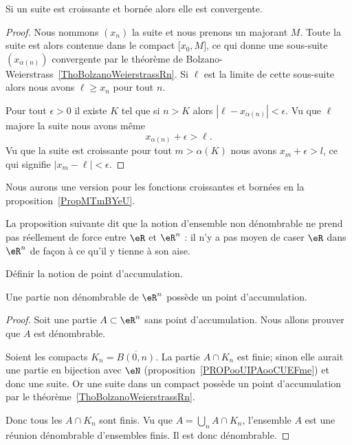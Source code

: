 \begin{corollary}   \label{CorFHbMqGGyi}
    Si un suite est croissante et bornée alors elle est convergente.
\end{corollary}

\begin{proof}
    Nous nommons \( (x_n)\) la suite et nous prenons un majorant \( M\). Toute la suite est alors contenue dans le compact \( \mathopen[ x_0 , M \mathclose]\), ce qui donne une sous-suite \( (x_{\alpha(n)})\) convergente par le théorème de Bolzano-Weierstrass~\ref{ThoBolzanoWeierstrassRn}. Si \( \ell\) est la limite de cette sous-suite alors nous avons \( \ell\geq x_n\) pour tout \( n\).

    Pour tout \( \epsilon>0\) il existe \( K\) tel que si \( n>K\) alors \( | \ell-x_{\alpha(n)} |<\epsilon\). Vu que \( \ell\) majore la suite nous avons même
    \begin{equation}
        x_{\alpha(n)}+\epsilon>\ell.
    \end{equation}
    Vu que la suite est croissante pour tout \( m>\alpha(K)\) nous avons \( x_m+\epsilon>l\), ce qui signifie \( | x_m-\ell |<\epsilon\).
\end{proof}
Nous aurons une version pour les fonctions croissantes et bornées en la proposition~\ref{PropMTmBYeU}.

La proposition suivante dit que la notion d'ensemble non dénombrable ne prend pas réellement de force entre \( \eR\) et \( \eR^n\) : il n'y a pas moyen de caser \( \eR\) dans \( \eR^n\) de façon à ce qu'il y tienne à son aise.

\begin{probleme}        \label{PROBooHILAooGDMxav}
Définir la notion de point d'accumulation.
\end{probleme}

\begin{proposition}
    Une partie non dénombrable de \( \eR^n\) possède un point d'accumulation.
\end{proposition}

\begin{proof}
    Soit une partie \( A\subset \eR^n\) sans point d'accumulation. Nous allons prouver que \( A\) est dénombrable.

    Soient les compacts \( K_n=\overline{ B(0,n) }\). La partie \( A\cap K_n\) est finie; sinon elle aurait une partie en bijection avec \( \eN\) (proposition~\ref{PROPooUIPAooCUEFme}) et donc une suite. Or une suite dans un compact possède un point d'accumulation par le théorème~\ref{ThoBolzanoWeierstrassRn}.

    Donc tous les \( A\cap K_n\) sont finis. Vu que \( A=\bigcup_nA\cap K_n\), l'ensemble \( A\) est une réunion dénombrable d'ensembles finis. Il est donc dénombrable.
\end{proof}

